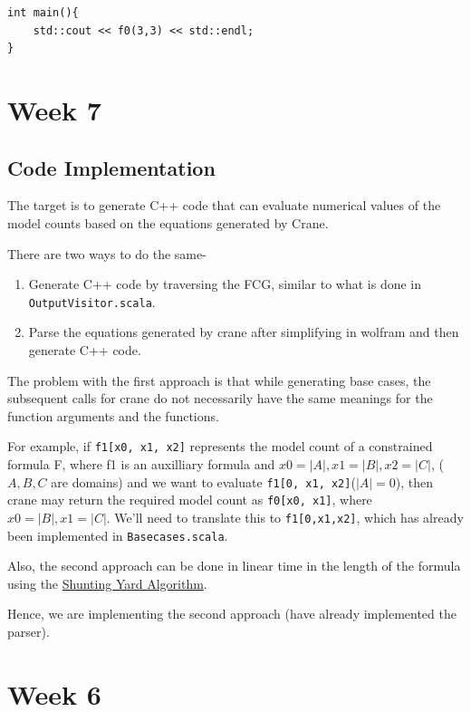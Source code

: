 \documentclass[12pt]{report}
\begin{document}
\begin{verbatim}
int main(){
	std::cout << f0(3,3) << std::endl;
}
    \end{verbatim}
    \chapter*{Week 7}
    \section*{Code Implementation}
    The target is to generate C++ code that can evaluate numerical values of the model counts based on the equations generated by Crane. 

    There are two ways to do the same-

    \begin{enumerate}
        \item Generate C++ code by traversing the FCG, similar to what is done in \texttt{OutputVisitor.scala}.
        \item Parse the equations generated by crane after simplifying in wolfram and then generate C++ code.
    \end{enumerate}

    The problem with the first approach is that while generating base cases, the subsequent calls for crane do not necessarily have the same meanings for the function arguments and the functions.

    For example, if \texttt{f1[x0, x1, x2]} represents the model count of a constrained formula F, where f1 is an auxilliary formula and $x0 = |A|, x1 = |B|, x2 = |C|$, ($A,B,C$ are domains) and we want to evaluate \texttt{f1[0, x1, x2]}($|A| = 0$), then crane may return the required model count as \texttt{f0[x0, x1]}, where $x0 = |B|, x1 = |C|$. We'll need to translate this to \texttt{f1[0,x1,x2]}, which has already been implemented in \texttt{Basecases.scala}.

    Also, the second approach can be done in linear time in the length of the formula using the \href{https://en.wikipedia.org/wiki/Shunting_yard_algorithm#:~:text=In%20computer%20science%2C%20the%20shunting,abstract%20syntax%20tree%20(AST).}{Shunting Yard Algorithm}.

    Hence, we are implementing the second approach (have already implemented the parser).
    \chapter*{Week 6}
\end{document}
